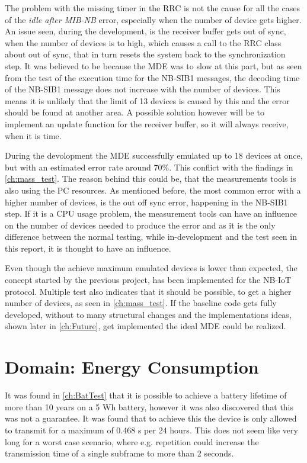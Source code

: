 The problem with the missing timer in the RRC is not the cause for all the cases of the \textit{idle after MIB-NB} error, especially when the number of device gets higher. An issue seen, during the development, is the receiver buffer gets out of sync, when the number of devices is to high, which causes a call to the RRC class about out of sync, that in turn resets the system back to the synchronization step. It was believed to be because the MDE was to slow at this part, but as seen from the test of the execution time for the NB-SIB1 messages, the decoding time of the NB-SIB1 message does not increase with the  number of devices. This means it is unlikely that the limit of 13 devices is caused by this and the error should be found at another area. A possible solution however will be to implement an update function for the receiver buffer, so it will always receive, when it is time.

During the devolopment the MDE successfully emulated up to 18 devices at once, but with an estimated error rate around 70\%. This conflict with the findings in \autoref{ch:mass_test}. The reason behind this could be, that the measurements tools is also using the PC resources. As mentioned before, the most common error with a higher number of devices, is the out off sync error, happening in the NB-SIB1 step. If it is a CPU usage problem, the measurement tools can have an influence on the number of devices needed to produce the error and as it is the only difference between the normal testing, while in-development and the test seen in this report, it is thought to have an influence.

Even though the achieve maximum emulated devices is lower than expected, the concept started by the previous project, has been implemented for the NB-IoT protocol. Multiple test also indicates that it should be possible, to get a higher number of devices, as seen in \autoref{ch:mass_test}. If the baseline code gets fully developed, without to many structural changes and the implementations ideas, shown later in \autoref{ch:Future}, get implemented the ideal MDE could be realized. 



\section{Domain: Energy Consumption}
It was found in \autoref{ch:BatTest} that it is possible to achieve a battery lifetime of more than 10 years on a 5 Wh battery, however it was also discovered that this was not a guarantee. It was found that to achieve this the device is only allowed to transmit for a maximum of 0.468 s per 24 hours. This does not seem like very long for a worst case scenario, where e.g. repetition could increase the transmission time of a single subframe to more than 2 seconds. 

